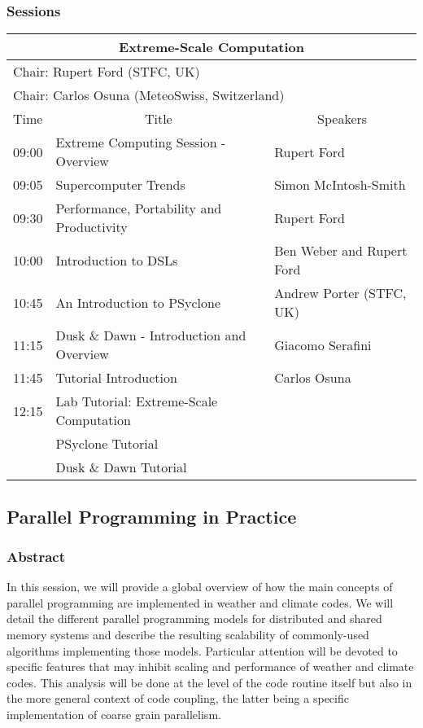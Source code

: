 \subsubsection{Sessions}

\begin{table}[H]
\begin{center}
\begin{tabular}{|l|l|l|}
\hline
\multicolumn{3}{|c|}{\textbf{Extreme-Scale Computation}} \\ \hline
\multicolumn{3}{|l|}{Chair: Rupert Ford (STFC, UK)} \\
\multicolumn{3}{|l|}{Chair: Carlos Osuna (MeteoSwiss, Switzerland)} \\ \hline \hline
Time & \multicolumn{1}{c|}{Title} & \multicolumn{1}{c|}{Speakers} \\ \hline \hline
09:00 & Extreme Computing Session - Overview & Rupert Ford \\ \hline
09:05 & Supercomputer Trends & Simon McIntosh-Smith \\ \hline
09:30 & Performance, Portability and Productivity & Rupert Ford \\ \hline
10:00 & Introduction to DSLs & Ben Weber and Rupert Ford \\ \hline
10:45 & An Introduction to PSyclone & Andrew Porter (STFC, UK) \\ \hline
11:15 & Dusk \& Dawn - Introduction and Overview & Giacomo Serafini \\ \hline
11:45 & Tutorial Introduction & Carlos Osuna \\ \hline
12:15 & Lab Tutorial: Extreme-Scale Computation & \\ \hline
      & PSyclone Tutorial & \\ \hline
      & Dusk \& Dawn Tutorial & \\ \hline
\end{tabular}
\end{center}
\end{table}

\subsection{Parallel Programming in Practice}

\subsubsection{Abstract}

In this session, we will provide a global overview of how the main concepts of parallel programming are implemented in weather and climate codes. We will detail the different parallel programming models for distributed and shared memory systems and describe the resulting scalability of commonly-used algorithms implementing those models. Particular attention will be devoted to specific features that may inhibit scaling and performance of weather and climate codes. This analysis will be done at the level of the code routine itself but also in the more general context of code coupling, the latter being a specific implementation of coarse grain parallelism.

